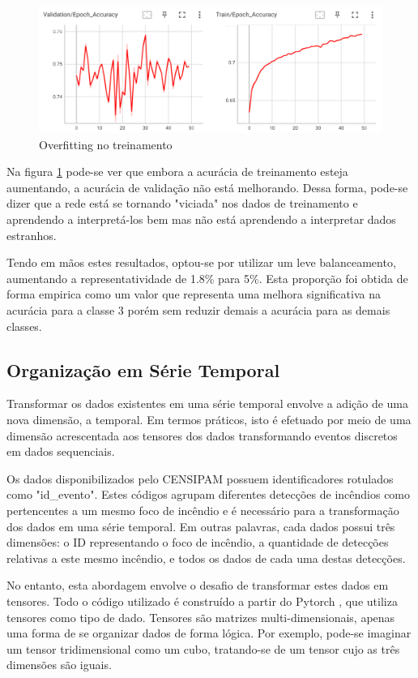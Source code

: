 \begin{figure}[ht]
    \centering
    \includegraphics[scale=0.5]{tg1/figuras/overfit.png}
    \caption{Overfitting no treinamento}
    \label{fig:overfitting}
\end{figure}

Na figura \ref{fig:overfitting} pode-se ver que embora a acurácia de treinamento esteja aumentando, a acurácia de validação não está melhorando. Dessa forma, pode-se dizer que a rede está se tornando "viciada" nos dados de treinamento e aprendendo a interpretá-los bem mas não está aprendendo a interpretar dados estranhos.

Tendo em mãos estes resultados, optou-se por utilizar um leve balanceamento, aumentando a representatividade de 1.8\% para 5\%. Esta proporção foi obtida de forma empirica como um valor que representa uma melhora significativa na acurácia para a classe 3 porém sem reduzir demais a acurácia para as demais classes.


\subsection{Organização em Série Temporal}

Transformar os dados existentes em uma série temporal envolve a adição de uma nova dimensão, a temporal. Em termos práticos, isto é efetuado por meio de uma dimensão acrescentada aos tensores dos dados transformando eventos discretos em dados sequenciais. 

Os dados disponibilizados pelo CENSIPAM possuem identificadores rotulados como "id\_evento". Estes códigos agrupam diferentes detecções de incêndios como pertencentes a um mesmo foco de incêndio e é necessário para a transformação dos dados em uma série temporal. Em outras palavras, cada dados possui três dimensões: o ID representando o foco de incêndio, a quantidade de detecções relativas a este mesmo incêndio, e todos os dados de cada uma destas detecções.

No entanto, esta abordagem envolve o desafio de transformar estes dados em tensores. Todo o código utilizado é construído a partir do Pytorch \cite{NEURIPS2019_9015}, que utiliza tensores como tipo de dado. Tensores são matrizes multi-dimensionais, apenas uma forma de se organizar dados de forma lógica. Por exemplo, pode-se imaginar um tensor tridimensional como um cubo, tratando-se de um tensor cujo as três dimensões são iguais.

